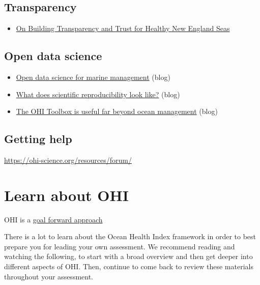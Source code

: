 \documentclass[
]{book}
\providecommand{\tightlist}{%
  \setlength{\itemsep}{0pt}\setlength{\parskip}{0pt}}
\begin{document}
\hypertarget{transparency}{%
\section{Transparency}\label{transparency}}

\begin{itemize}
\tightlist
\item
  \href{https://ohi-science.org/news/transparent-trust-new-england-seas}{On Building Transparency and Trust for Healthy New England Seas}
\end{itemize}

\hypertarget{open-data-science}{%
\section{Open data science}\label{open-data-science}}

\begin{itemize}
\tightlist
\item
  \href{https://ohi-science.org/news/ohi-and-open-data-science}{Open data science for marine management} (blog)
\item
  \href{https://ohi-science.org/news/scientific-reproducibility-with-fellows}{What does scientific reproducibility look like?} (blog)
\item
  \href{https://ohi-science.org/news/what-is-the-ohi-toolbox}{The OHI Toolbox is useful far beyond ocean management} (blog)
\end{itemize}

\hypertarget{getting-help}{%
\section{Getting help}\label{getting-help}}

\url{https://ohi-science.org/resources/forum/}

\hypertarget{ohi}{%
\chapter{Learn about OHI}\label{ohi}}

OHI is a \href{https://ohi-science.org/news/goal-forward-approach}{goal forward approach}

There is a lot to learn about the Ocean Health Index framework in order to best prepare you for leading your own assessment. We recommend reading and watching the following, to start with a broad overview and then get deeper into different aspects of OHI. Then, continue to come back to review these materials throughout your assessment.
\end{document}
